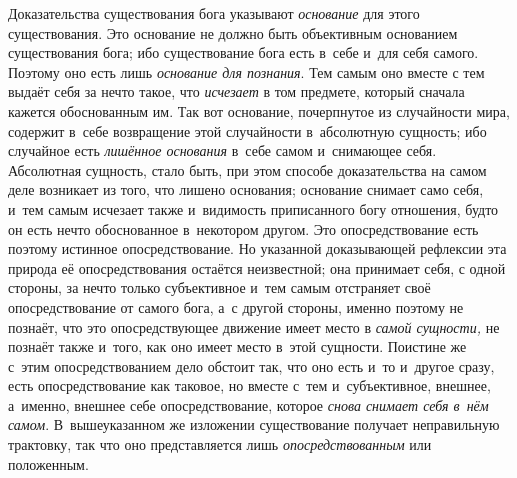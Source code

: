 Доказательства существования бога указывают
{\em основание} для этого существования. Это основание
не должно быть объективным основанием существования бога; ибо существование
бога есть в~себе и~для себя самого. Поэтому оно есть лишь
{\em основание для познания}. Тем самым оно вместе с
тем выдаёт себя за нечто такое, что {\em исчезает} в
том предмете, который сначала кажется обоснованным им. Так вот основание,
почерпнутое из случайности мира, содержит в~себе возвращение этой
случайности в~абсолютную сущность; ибо случайное есть
{\em лишённое основания} в~себе самом и~снимающее себя.
Абсолютная сущность, стало быть, при этом способе доказательства на самом
деле возникает из того, что лишено основания; основание снимает само себя,
и~тем самым исчезает также и~видимость приписанного богу отношения, будто
он есть нечто обоснованное в~некотором другом. Это опосредствование есть
поэтому истинное опосредствование. Но указанной доказывающей рефлексии эта
природа её опосредствования остаётся неизвестной; она принимает себя, с
одной стороны, за нечто только субъективное и~тем самым отстраняет своё
опосредствование от самого бога, а~с другой стороны, именно поэтому не
познаёт, что это опосредствующее движение имеет место в
{\em самой сущности,} не познаёт также и~того, как оно
имеет место в~этой сущности. Поистине же с~этим опосредствованием дело
обстоит так, что оно есть и~то и~другое сразу, есть опосредствование как
таковое, но вместе с~тем и~субъективное, внешнее, а~именно, внешнее себе
опосредствование, которое {\em снова снимает себя в~нём
самом}. В~вышеуказанном же изложении существование получает неправильную
трактовку, так что оно представляется лишь
{\em опосредствованным} или положенным.


